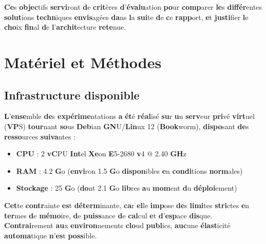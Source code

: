\documentclass{rapportClass} %
\begin{document}
\textbf{Ce}s \textbf{objec}tifs \textbf{servi}ront \textbf{d}e \textbf{crit}ères \textbf{d}’\textbf{évalu}ation \textbf{po}ur \textbf{comp}arer \textbf{le}s
\textbf{différ}entes \textbf{solut}ions \textbf{techn}iques \textbf{envis}agées \textbf{da}ns \textbf{l}a \textbf{sui}te \textbf{d}e \textbf{c}e
\textbf{rapp}ort, \textbf{e}t \textbf{justi}fier \textbf{l}e \textbf{cho}ix \textbf{fin}al \textbf{d}e \textbf{l}’\textbf{archit}ecture \textbf{rete}nue.


\chapter{Matériel et Méthodes}

\section{Infrastructure disponible}

\textbf{L}'\textbf{ense}mble \textbf{de}s \textbf{expérime}ntations \textbf{a} \textbf{ét}é \textbf{réal}isé \textbf{su}r \textbf{u}n \textbf{serv}eur \textbf{pri}vé
\textbf{virt}uel (\textbf{VP}S) \textbf{tour}nant \textbf{so}us \textbf{Deb}ian \textbf{GN}U/\textbf{Lin}ux 12 (\textbf{Book}worm), 
\textbf{dispo}sant \textbf{de}s \textbf{resso}urces \textbf{suiva}ntes :

\begin{itemize}
    \item \textbf{\textbf{CP}U} : 2 \textbf{vC}PU \textbf{Int}el \textbf{Xe}on \textbf{E}5-2680 \textbf{v}4 @ 2.40 \textbf{GH}z
    \item \textbf{\textbf{RA}M} : 4.2 \textbf{G}o (\textbf{envi}ron 1.5 \textbf{G}o \textbf{dispon}ibles \textbf{e}n \textbf{condi}tions \textbf{norm}ales)
    \item \textbf{\textbf{Stoc}kage} : 25 \textbf{G}o (\textbf{do}nt 2.1 \textbf{G}o \textbf{lib}res \textbf{a}u \textbf{mom}ent \textbf{d}u \textbf{déploi}ement)
\end{itemize}

\vspace{0.5cm}

\textbf{Cet}te \textbf{contr}ainte \textbf{es}t \textbf{déterm}inante, \textbf{ca}r \textbf{el}le \textbf{imp}ose \textbf{de}s \textbf{limi}tes \textbf{stri}ctes
\textbf{e}n \textbf{ter}mes \textbf{d}e \textbf{mémo}ire, \textbf{d}e \textbf{puiss}ance \textbf{d}e \textbf{cal}cul \textbf{e}t \textbf{d}’\textbf{esp}ace \textbf{dis}que. \textbf{Contrai}rement
\textbf{au}x \textbf{environ}nements \textbf{clo}ud \textbf{publ}ics, \textbf{auc}une \textbf{élast}icité \textbf{automa}tique \textbf{n}’\textbf{es}t
\textbf{poss}ible.
\end{document}
